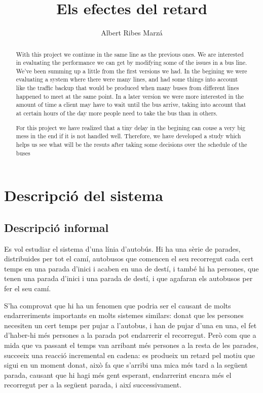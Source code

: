 \documentclass[a4paper,10pt]{article}
\title{Els efectes del retard}
\author{Albert Ribes Marzá}
\begin{document}
\maketitle

\begin{abstract}
With this project we continue in the same line as the previous ones. We are interested in evaluating the performance we can get by modifying some of the issues in a bus line. We've been summing up a little from the first versions we had. In the begining we were evaluating a system where there were many lines, and had some things into account like the traffic backup that would be produced when many buses from different lines happened to meet at the same point. In a later version we were more interested in the amount of time a client may have to wait until the bus arrive, taking into account that at certain hours of the day more people need to take the bus than in others.

For this project we have realized that a tiny delay in the begining can couse a very big mess in the end if it is not handled well. Therefore, we have developed a study which helps us see what will be the resuts after taking some decisions over the schedule of the buses

\end{abstract}

\tableofcontents



\section{Descripció del sistema}

\subsection{Descripció informal}

Es vol estudiar el sistema d'una línia d'autobús. Hi ha una sèrie de parades, distribuides per tot el camí, autobusos que comencen el seu recorregut cada cert temps en una parada d'inici i acaben en una de destí, i també hi ha persones, que tenen una parada d'inici i una parada de destí, i que agafaran els autobusos per fer el seu camí.

S'ha comprovat que hi ha un fenomen que podria ser el causant de molts endarreriments importants en molts sistemes similars: donat que les persones necesiten un cert temps per pujar a l'autobus, i han de pujar d'una en una, el fet d'haber-hi més persones a la parada pot endarrerir el recorregut. Però com que a mida que va passant el temps van arribant més persones a la resta de les parades, succeeix una reacció incremental en cadena: es produeix un retard pel motiu que sigui en un moment donat, això fa que s'arribi una mica més tard a la següent parada, causant que hi hagi més gent esperant, endarrerint encara més el recorregut per a la següent parada, i així successivament.
\end{document}
